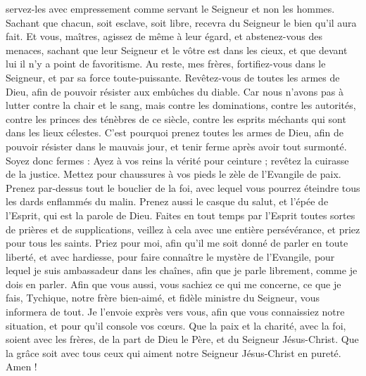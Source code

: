 \begin{multicols}{2}
servez-les avec empressement comme servant le Seigneur et non les hommes.
Sachant que chacun, soit esclave, soit libre, recevra du Seigneur le bien qu'il aura fait.
Et vous, maîtres, agissez de même à leur égard, et abstenez-vous des menaces, sachant que leur Seigneur et le vôtre est dans les cieux, et que devant lui il n'y a point de favoritisme.
Au reste, mes frères, fortifiez-vous dans le Seigneur, et par sa force toute-puissante.
Revêtez-vous de toutes les armes de Dieu, afin de pouvoir résister aux embûches du diable.
Car nous n'avons pas à lutter contre la chair et le sang, mais contre les dominations, contre les autorités, contre les princes des ténèbres de ce siècle, contre les esprits méchants qui sont dans les lieux célestes.
C'est pourquoi prenez toutes les armes de Dieu, afin de pouvoir résister dans le mauvais jour, et tenir ferme après avoir tout surmonté.
Soyez donc fermes : Ayez à vos reins la vérité pour ceinture ; revêtez la cuirasse de la justice.
Mettez pour chaussures à vos pieds le zèle de l'Evangile de paix.
Prenez par-dessus tout le bouclier de la foi, avec lequel vous pourrez éteindre tous les dards enflammés du malin.
Prenez aussi le casque du salut, et l'épée de l'Esprit, qui est la parole de Dieu.
Faites en tout temps par l’Esprit toutes sortes de prières et de supplications, veillez à cela avec une entière persévérance, et priez pour tous les saints.
Priez pour moi, afin qu'il me soit donné de parler en toute liberté, et avec hardiesse, pour faire connaître le mystère de l'Evangile,
pour lequel je suis ambassadeur dans les chaînes, afin que je parle librement, comme je dois en parler.
Afin que vous aussi, vous sachiez ce qui me concerne, ce que je fais, Tychique, notre frère bien-aimé, et fidèle ministre du Seigneur, vous informera de tout.
Je l’envoie exprès vers vous, afin que vous connaissiez notre situation, et pour qu'il console vos cœurs.
Que la paix et la charité, avec la foi, soient avec les frères, de la part de Dieu le Père, et du Seigneur Jésus-Christ.
Que la grâce soit avec tous ceux qui aiment notre Seigneur Jésus-Christ en pureté. Amen !
\PPE{}
\end{multicols}
